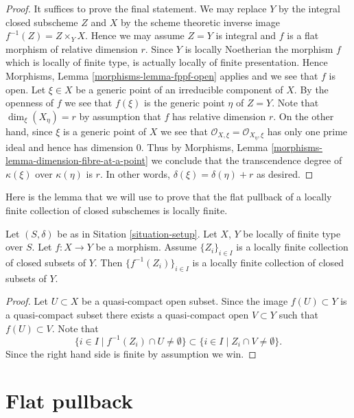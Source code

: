 \begin{proof}
It suffices to prove the final statement.
We may replace $Y$ by the integral closed subscheme $Z$ and
$X$ by the scheme theoretic inverse image $f^{-1}(Z) = Z \times_Y X$.
Hence we may assume $Z = Y$ is integral and $f$ is a flat morphism
of relative dimension $r$. Since $Y$ is locally Noetherian the
morphism $f$ which is locally of finite type,
is actually locally of finite presentation. Hence
Morphisms, Lemma \ref{morphisms-lemma-fppf-open}
applies and we see that $f$ is open.
Let $\xi \in X$ be a generic point of an irreducible component
of $X$. By the openness of $f$ we see that $f(\xi)$ is the
generic point $\eta$ of $Z = Y$. Note that $\dim_\xi(X_\eta) = r$
by assumption that $f$ has relative dimension $r$. On the other
hand, since $\xi$ is a generic point of $X$ we see that
$\mathcal{O}_{X, \xi} = \mathcal{O}_{X_\eta, \xi}$ has only one
prime ideal and hence has dimension $0$. Thus by
Morphisms, Lemma \ref{morphisms-lemma-dimension-fibre-at-a-point}
we conclude that the transcendence
degree of $\kappa(\xi)$ over $\kappa(\eta)$ is $r$.
In other words, $\delta(\xi) = \delta(\eta) + r$ as desired.
\end{proof}

\noindent
Here is the lemma that we will use to prove that the flat pullback
of a locally finite collection of closed subschemes is locally finite.

\begin{lemma}
\label{lemma-inverse-image-locally-finite}
Let $(S, \delta)$ be as in Sitation \ref{situation-setup}.
Let $X$, $Y$ be locally of finite type over $S$.
Let $f : X \to Y$ be a morphism.
Assume $\{Z_i\}_{i \in I}$ is a locally
finite collection of closed subsets of $Y$.
Then $\{f^{-1}(Z_i)\}_{i \in I}$ is a locally finite
collection of closed subsets of $Y$.
\end{lemma}

\begin{proof}
Let $U \subset X$ be a quasi-compact open subset.
Since the image $f(U) \subset Y$ is a quasi-compact subset
there exists a quasi-compact open $V \subset Y$ such that
$f(U) \subset V$. Note that 
$$
\{i \in I \mid f^{-1}(Z_i) \cap U \not = \emptyset \}
\subset
\{i \in I \mid Z_i \cap V \not = \emptyset \}.
$$
Since the right hand side is finite by assumption we win.
\end{proof}



\section{Flat pullback}
\label{section-flat-pullback}

